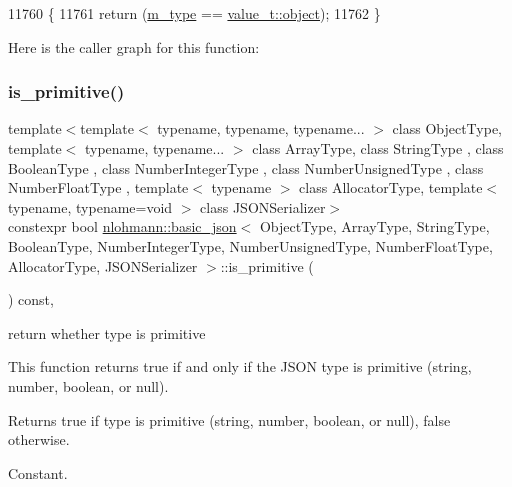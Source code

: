 \begin{DoxyCode}
11760     \{
11761         \textcolor{keywordflow}{return} (\hyperlink{classnlohmann_1_1basic__json_a91990b60d7d4d67968a2c1db677536e7}{m\_type} == \hyperlink{namespacenlohmann_1_1detail_a1ed8fc6239da25abcaf681d30ace4985aa8cfde6331bd59eb2ac96f8911c4b666}{value\_t::object});
11762     \}
\end{DoxyCode}
Here is the caller graph for this function\+:
\mbox{\label{classnlohmann_1_1basic__json_a6362b88718eb5c6d4fed6a61eed44b95}} 
\subsubsection{\texorpdfstring{is\+\_\+primitive()}{is\_primitive()}}
{\footnotesize\ttfamily template$<$template$<$ typename, typename, typename... $>$ class Object\+Type, template$<$ typename, typename... $>$ class Array\+Type, class String\+Type , class Boolean\+Type , class Number\+Integer\+Type , class Number\+Unsigned\+Type , class Number\+Float\+Type , template$<$ typename $>$ class Allocator\+Type, template$<$ typename, typename=void $>$ class J\+S\+O\+N\+Serializer$>$ \\
constexpr bool \hyperlink{classnlohmann_1_1basic__json}{nlohmann\+::basic\+\_\+json}$<$ Object\+Type, Array\+Type, String\+Type, Boolean\+Type, Number\+Integer\+Type, Number\+Unsigned\+Type, Number\+Float\+Type, Allocator\+Type, J\+S\+O\+N\+Serializer $>$\+::is\+\_\+primitive (\begin{DoxyParamCaption}{ }\end{DoxyParamCaption}) const\hspace{0.3cm}{\ttfamily [inline]}, {\ttfamily [noexcept]}}



return whether type is primitive 

This function returns true if and only if the J\+S\+ON type is primitive (string, number, boolean, or null).

\begin{DoxyReturn}{Returns}
{\ttfamily true} if type is primitive (string, number, boolean, or null), {\ttfamily false} otherwise.
\end{DoxyReturn}
Constant.

